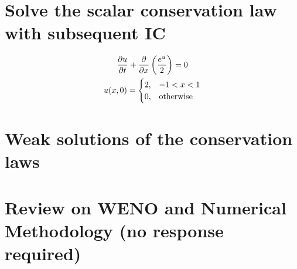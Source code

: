 \documentclass{article}
\begin{document}
\section{Solve the scalar conservation law with subsequent IC}
\begin{gather*}
    \frac{\partial u}{\partial t} + \frac{\partial }{\partial x}\left(\frac{e^u}{2}\right) = 0\\
    u(x,0) = \begin{cases}
        2, & -1 < x < 1\\
        0, & \text{otherwise}
        \end{cases}
\end{gather*}

\section{Weak solutions of the conservation laws}

\section{Review on WENO and Numerical Methodology (no response required)}
\end{document}
